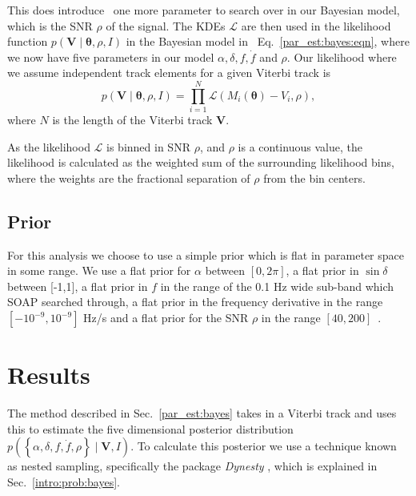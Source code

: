 This does introduce~ one more parameter to search over in our
Bayesian model, which is the \gls{SNR} $\rho$ of the signal.  The \glspl{KDE}
$\mathcal{L}$ are then used in the likelihood function $p(\bm{V} \mid
\bm{\theta}, \rho, I)$ in the Bayesian model in~
Eq.~\ref{par_est:bayes:eqn}, where we now have five parameters in our model
$\alpha, \delta, f, \dot{f}$ and $\rho$.  Our likelihood where we assume
independent track elements for a given Viterbi track is
%
\begin{equation} 
p(\bm{V} \mid \bm{\theta}, \rho, I) = \prod_{i =
1}^{N} \mathcal{L}(M_i(\bm{\theta}) - V_i, \rho) , 
\end{equation} 
%
where $N$ is the length of the Viterbi track $\bm{V}$.  

\if
As the likelihood $\mathcal{L}$ is binned in \gls{SNR} $\rho$, and $\rho$ is a
continuous value, the likelihood is calculated as the weighted sum of the
surrounding likelihood bins, where the weights are the fractional separation of
$\rho$ from the bin centers.  
\fi

%
\subsection{Prior}
%
For this analysis we choose to use a simple prior which is flat in parameter space in some range.  We use a flat prior for $\alpha$
between $[0,2\pi]$, a flat prior in $\sin{\delta}$ between [-1,1], a flat prior
in $f$ in the range of the 0.1 Hz wide sub-band which SOAP searched through, a
flat prior in the frequency derivative in the range
$[-10^{-9},10^{-9}]$ Hz/s and a flat prior for the \gls{SNR} $\rho$ in
the range $[40,200]$~.


\clearpage

\section{\label{par_est:results}Results}

The method described in Sec.~\ref{par_est:bayes} takes in a Viterbi track and
uses this to estimate the five dimensional posterior distribution
$p\left(\left\{ \alpha, \delta, f, \dot{f}, \rho \right\} \mid \bm{V}, I
\right)$.  To calculate this posterior we use a technique known as nested
sampling, specifically the package {\it Dynesty}
\citep{speagle2019DynestyDynamic}, which is explained in
Sec.~\ref{intro:prob:bayes}.

